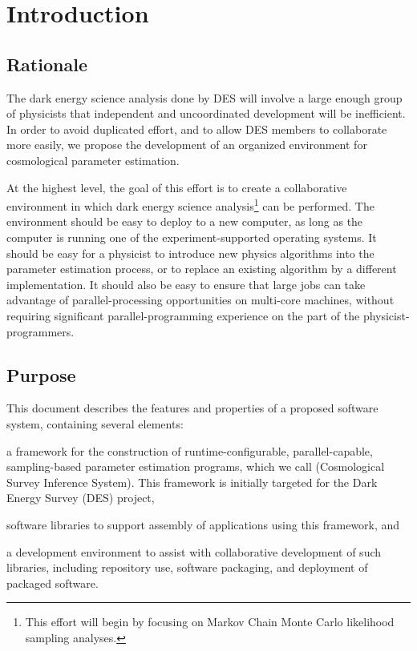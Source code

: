 \documentclass[draftmode,draftwater]{memarticle}
\newcommand{\cosmosis}{\name{CosmoSIS}\xspace}
\begin{document}
	
\topmatter %

\chapter{Introduction\label{ch:introduction}}


\section{Rationale\label{sec:rationale}}

The dark energy science analysis done by DES will involve a large enough
group of physicists that independent and uncoordinated development will
be inefficient. In order to avoid duplicated effort, and to allow DES
members to collaborate more easily, we propose the development of an
organized environment for cosmological parameter estimation.

At the highest level, the goal of this effort is to create a
collaborative environment in which dark energy science
analysis\footnote{This effort will begin by focusing on Markov Chain
  Monte Carlo likelihood sampling analyses.} can be performed. The
environment should be easy to deploy to a new computer, as long as the
computer is running one of the experiment-supported operating systems.
It should be easy for a physicist to introduce new physics algorithms
into the parameter estimation process, or to replace an existing
algorithm by a different implementation. It should also be easy to
ensure that large jobs can take advantage of parallel-processing
opportunities on multi-core machines, without requiring significant
parallel-programming experience on the part of the
physicist-programmers.

\section{Purpose\label{sec:purpose}}

This document describes the features and properties of a proposed
software system, containing several elements:
\begin{inparaenum}[(a)]
\item a framework for the construction of runtime-configurable,
  parallel-capable, sampling-based parameter estimation programs, which
  we call \cosmosis (Cosmological Survey Inference System). This
  framework is initially targeted for the Dark Energy Survey
  (DES)\cite{des} project,
\item software libraries to support assembly of applications using this
  framework, and
\item a development environment to assist with collaborative development
  of such libraries, including repository use, software packaging, and
  deployment of packaged software.
\end{inparaenum}
\end{document}
